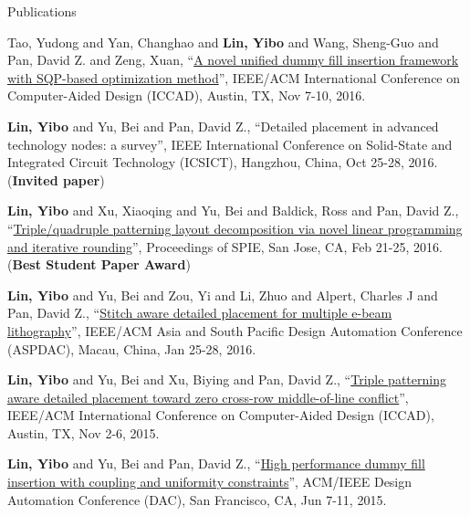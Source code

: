 \begin{rSection}{Publications}
\begin{description}[font=\normalfont]
{}
        

\item[{[C7]}]{
        Tao, Yudong and Yan, Changhao and \textbf{Lin, Yibo} and Wang, Sheng-Guo and Pan, David Z. and Zeng, Xuan, 
    ``\href{http://dx.doi.org/10.1145/2966986.2966994}{A novel unified dummy fill insertion framework with SQP-based optimization method}'', 
    IEEE/ACM International Conference on Computer-Aided Design (ICCAD), Austin, TX, Nov 7-10, 2016.
    
}
        

\item[{[C6]}]{
        \textbf{Lin, Yibo} and Yu, Bei and Pan, David Z., 
    ``Detailed placement in advanced technology nodes: a survey'', 
    IEEE International Conference on Solid-State and Integrated Circuit Technology (ICSICT), Hangzhou, China, Oct 25-28, 2016.
    (\textbf{Invited paper})
}
        

\item[{[C5]}]{
        \textbf{Lin, Yibo} and Xu, Xiaoqing and Yu, Bei and Baldick, Ross and Pan, David Z., 
    ``\href{http://dx.doi.org/10.1117/12.2218628}{Triple/quadruple patterning layout decomposition via novel linear programming and iterative rounding}'', 
    Proceedings of SPIE, San Jose, CA, Feb 21-25, 2016.
    (\textbf{Best Student Paper Award})
}
        

\item[{[C4]}]{
        \textbf{Lin, Yibo} and Yu, Bei and Zou, Yi and Li, Zhuo and Alpert, Charles J and Pan, David Z., 
    ``\href{http://ieeexplore.ieee.org/xpl/articleDetails.jsp?arnumber=7428009}{Stitch aware detailed placement for multiple e-beam lithography}'', 
    IEEE/ACM Asia and South Pacific Design Automation Conference (ASPDAC), Macau, China, Jan 25-28, 2016.
    
}
        

\item[{[C3]}]{
        \textbf{Lin, Yibo} and Yu, Bei and Xu, Biying and Pan, David Z., 
    ``\href{http://dl.acm.org/citation.cfm?id=2840875}{Triple patterning aware detailed placement toward zero cross-row middle-of-line conflict}'', 
    IEEE/ACM International Conference on Computer-Aided Design (ICCAD), Austin, TX, Nov 2-6, 2015.
    
}
        

\item[{[C2]}]{
        \textbf{Lin, Yibo} and Yu, Bei and Pan, David Z., 
    ``\href{http://dl.acm.org/citation.cfm?id=2744769.2744850}{High performance dummy fill insertion with coupling and uniformity constraints}'', 
    ACM/IEEE Design Automation Conference (DAC), San Francisco, CA, Jun 7-11, 2015.
    
}
\end{description}
\end{rSection}
